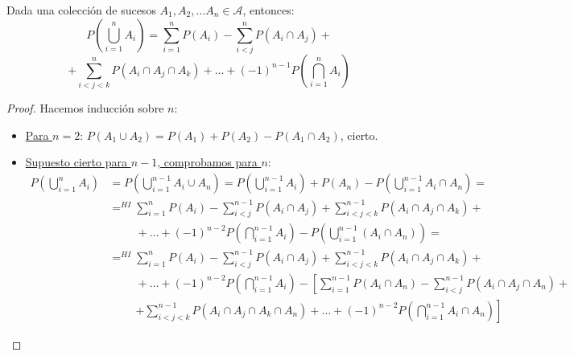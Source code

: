 \begin{prop}
    Dada una colección de sucesos $A_1, A_2, \ldots A_n\in
    \mathcal{A}$, entonces:
  $$P\left(\bigcup_{i=1}^n A_i\right) = \sum_{i=1}^n P(A_i) - \sum_{i<j}^n P(A_i \cap A_j) + $$$$ + \sum_{i<j<k}^n
    P(A_i \cap A_j \cap A_k) + \ldots + (-1)^{n-1} P\left(\bigcap_{i=1}^n A_i\right)$$
\end{prop}
\begin{proof}
  Hacemos inducción sobre $n$:
  \begin{itemize}
      \item \underline{Para $n=2$}: $P(A_1 \cup A_2) = P(A_1) + P(A_2) - P(A_1 \cap A_2)$, cierto.

      \item \underline{Supuesto cierto para $n-1$, comprobamos para $n$}:
      \begin{equation*}\begin{split}
          P\left(\bigcup_{i=1}^nA_i\right)
          &= P\left(\bigcup_{i=1}^{n-1}A_i \cup A_n\right)
          = P\left(\bigcup_{i=1}^{n-1}A_i\right) + P(A_n) - P\left(\bigcup_{i=1}^{n-1}A_i \cap A_n\right)
          =\\&\mathop{=}^{HI}
          \sum_{i=1}^{n} P(A_i) - \sum_{i<j}^{n-1} P(A_i \cap A_j) + \sum_{i<j<k}^{n-1} P(A_i \cap A_j \cap A_k) + \\ &\hspace{1cm}
          + \ldots + (-1)^{n-2} P\left(\bigcap_{i=1}^{n-1} A_i\right) - P\left(\bigcup_{i=1}^{n-1}(A_i \cap A_n)\right) 
          =\\&\mathop{=}^{HI}
          \sum_{i=1}^{n} P(A_i) - \sum_{i<j}^{n-1} P(A_i \cap A_j) + \sum_{i<j<k}^{n-1} P(A_i \cap A_j \cap A_k) + \\ &\hspace{1cm}
          + \ldots + (-1)^{n-2} P\left(\bigcap_{i=1}^{n-1} A_i\right) - \left[\sum_{i=1}^{n-1} P(A_i\cap A_n) - \sum_{i<j}^{n-1} P(A_i \cap A_j \cap A_n) + \right. \\ &\hspace{1cm} \left.
          + \sum_{i<j<k}^{n-1} P(A_i \cap A_j \cap A_k\cap A_n) + \ldots + (-1)^{n-2} P\left(\bigcap_{i=1}^{n-1} A_i\cap A_n\right) \right]
      \end{split}\end{equation*}


\end{itemize}
\end{proof}
